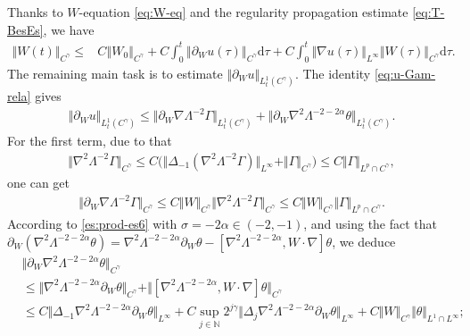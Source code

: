 \documentclass[reqno,11pt,a4paper]{amsart}
\newcommand{\NN}{\ensuremath{\mathbb{N}}}
\newcommand{\dd}{\mathrm{d}}
\def \p {\partial}
\begin{document}
Thanks to $W$-equation \eqref{eq:W-eq} and the regularity propagation estimate \eqref{eq:T-BesEs}, we have
\begin{equation}\label{eq:W-Cgam}
\begin{aligned}
  \Vert  W(t)\Vert _{C^\gamma} \leq & C \left\Vert  W_0\right\Vert _{C^\gamma}
  + C \int_0^t\left\Vert \partial_W u(\tau) \right\Vert _{C^\gamma} \mathrm{d} \tau 
  + C \int_0^t \Vert \nabla u(\tau)\Vert _{L^\infty}\Vert  W(\tau)\Vert _{C^\gamma} \dd\tau.
\end{aligned}
\end{equation}
The remaining main task is to estimate $\Vert \partial_W  u\Vert _{L^1_t(C^\gamma)}$. 
The identity \eqref{eq:u-Gam-rela} gives
\begin{align}\label{pWu}
  \Vert \partial_W  u\Vert _{L^1_t(C^\gamma)} 
  \leq \big\Vert \partial_W \nabla \Lambda^{-2} \Gamma\big\Vert _{L^1_t(C^\gamma)}
  + \big\Vert \partial_W  \nabla^2\Lambda^{-2-2\alpha} \theta \big\Vert _{L^1_t(C^\gamma)}.
\end{align}
For the first term, due to that
\begin{equation}\label{es:mDGam}
\begin{aligned}
  \Vert \nabla^2 \Lambda^{-2} \Gamma\Vert _{C^\gamma}
  \leq C \big(\Vert \Delta_{-1}(\nabla^2 \Lambda^{-2} \Gamma)\Vert _{L^\infty} + 
  \Vert \Gamma\Vert _{C^\gamma}\big)
  \leq C \Vert \Gamma\Vert _{L^p\cap C^\gamma},
\end{aligned}
\end{equation}
one can get 
\begin{align*}
  \Vert \partial_W \nabla \Lambda^{-2} \Gamma\Vert _{C^\gamma} 
  \leq C \Vert W\Vert _{C^\gamma} \Vert \nabla^2 \Lambda^{-2} \Gamma\Vert _{C^\gamma}
  \leq C \Vert W\Vert _{C^\gamma} \Vert \Gamma\Vert _{L^p \cap C^\gamma}.
\end{align*}
According to \eqref{es:prod-es6} with $\sigma = -2\alpha\in (-2,-1)$, and using the fact that 
$\p_W(\nabla^2\Lambda^{-2-2\alpha} \theta)=\nabla^2 \Lambda^{-2-2\alpha} 
\p_W\theta-[\nabla^2\Lambda^{-2-2\alpha}, W\cdot\nabla]\theta$, 
we deduce 
\begin{align*}
  &\big\Vert \partial_W \nabla^2 \Lambda^{-2-2\alpha} \theta \big\Vert _{C^\gamma} \\
  & \leq \Vert  \nabla^2 \Lambda^{-2-2\alpha} \p_W\theta\Vert _{C^\gamma} 
  + \Vert [\nabla^2 \Lambda^{-2-2\alpha}, W\cdot\nabla]\theta\Vert _{C^\gamma} \\
  & \leq C \Vert \Delta_{-1} \nabla^2 \Lambda^{-2-2\alpha} \p_W\theta\Vert _{L^\infty}
  + C \sup\limits_{j\in\NN} 2^{j\gamma}\Vert \Delta_j \nabla^2 \Lambda^{-2-2\alpha} 
  \p_W\theta\Vert _{L^\infty} + C \Vert  W\Vert _{C^\gamma}\Vert \theta\Vert _{L^1\cap L^\infty};
\end{align*}
\end{document}
